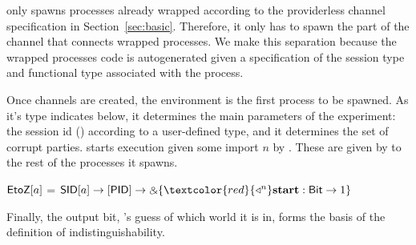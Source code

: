  only spawns processes already wrapped according to the providerless channel specification in Section~\ref{sec:basic}.
Therefore, it only has to spawn the part of the channel that connects wrapped processes.
We make this separation because the wrapped processes code is autogenerated given a specification of the session type and functional
type associated with the process.


Once channels are created, the environment \Z is the first process to be spawned.
As it's type  indicates below, it determines the main parameters of the experiment: the session id () according to a user-defined type, and 
it determines the set of corrupt parties. 
\Z starts execution given some import $n$ by .
These are given by  to the rest of the processes it spawns. 
\begin{center}
\vspace{-2mm}
\parbox{0cm}{
\begin{tabbing}
 $\mathsf{EtoZ}[a]$ = $\m{SID}[a] \arrow [\m{PID}] \arrow \echoice{\textcolor{red}{\getpot^n} \mb{start}: \m{Bit} \arrow 1}$
 \end{tabbing}}
\vspace{-2mm}
\end{center}
Finally, the output bit, \Z's guess of which world it is in, forms the basis of the definition of indistinguishability.

